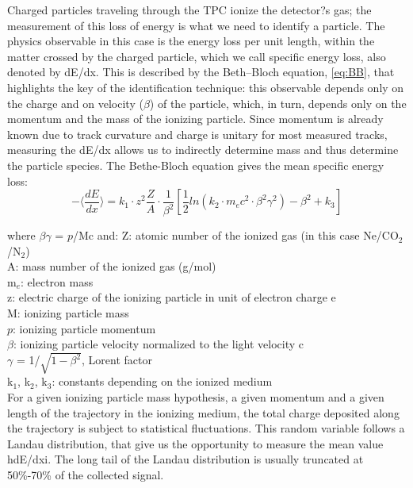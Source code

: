 Charged particles traveling through the TPC ionize the detector?s gas; the measurement of this loss of energy is what we need to identify a particle. The physics observable in this case is the energy loss per unit length, within the matter crossed by the charged particle, which we call specific energy loss, also denoted by dE/dx. This is described by the Beth--Bloch equation, \ref{eq:BB}, that highlights the key of the identification technique: this observable depends only on the charge and on velocity ($\beta$) of the particle, which, in turn, depends only on the momentum and the mass of the ionizing particle. Since momentum is already known due to track curvature and charge is unitary for most measured tracks, measuring the dE/dx allows us to indirectly determine mass and thus determine the particle species.
The Bethe-Bloch equation gives the mean specific energy loss:
\begin{equation}\label{eq:BB}
- \langle\frac{dE}{dx}\rangle = k_{1} \cdot z^{2} \frac{Z}{A} \cdot \frac{1}{\beta^{2}}[\frac{1}{2}ln(k_{2}\cdot m_{e}c^{2}\cdot \beta^{2} \gamma^{2})-\beta^{2}+k_{3}]
\end{equation}

where $\beta\gamma$ = $\ensuremath{p}$/Mc and:
Z: atomic number of the ionized gas (in this case Ne/CO$_{2}$/N$_{2}$)\\
A: mass number of the ionized gas (g/mol)\\
m$_{e}$: electron mass\\
z: electric charge of the ionizing particle in unit of electron charge e\\
M: ionizing particle mass\\
$\ensuremath{p}$: ionizing particle momentum\\
$\beta$: ionizing particle velocity normalized to the light velocity c\\
$\gamma$ = 1/$\sqrt{1-\beta^{2}}$, Lorent factor\\
k$_{1}$, k$_{2}$, k$_{3}$: constants depending on the ionized medium\\ 


For a given ionizing particle mass hypothesis, a given momentum and a given length of the trajectory in the ionizing medium, the total charge deposited along the trajectory is subject to statistical fluctuations. This random variable follows a Landau distribution, that give us the opportunity to measure the mean value hdE/dxi. The long tail of the Landau distribution is usually truncated at 50\%-70\% of the collected signal. 


